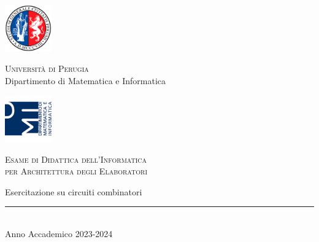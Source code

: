 
\thispagestyle{empty} %

\noindent %
\includegraphics[width=0.15\textwidth]{img/logoUniPg}
\begin{minipage}[b]{0.7\textwidth}
	\centering
	{\Large {\textsc{Universit{\`a} di Perugia}}}\\
	\vspace{0.4 em}
	{\large {Dipartimento di Matematica e Informatica}}
	\vspace{0.6 em}
\end{minipage}%
\includegraphics[width=0.15\textwidth]{img/logoDMI}

\vspace{5 em}

\begin{center}
	
	{\large {\textsc{Esame di Didattica dell'Informatica \\per Architettura degli Elaboratori}}}
	\vspace{8 em}
	
	{\Huge {Esercitazione su circuiti combinatori}}
	\vspace{10 em}
	
	
	\vspace{6 em}
	\vfill
	
	{\rule{380pt}{.4pt}}\\
	\vspace{1.2 em}
	\large{{Anno Accademico 2023-2024}}		
	
	
\end{center}

